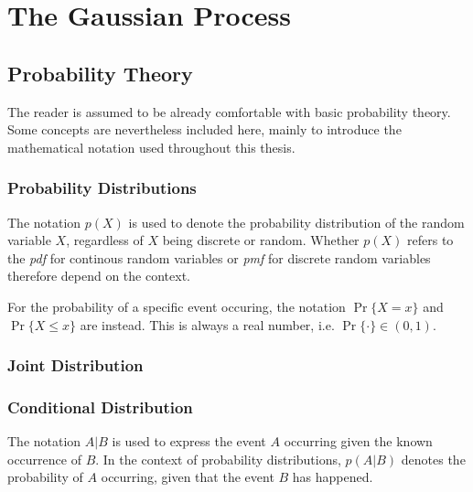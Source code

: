 \chapter{The Gaussian Process}\label{chap:theory}

\section{Probability Theory}
The reader is assumed to be already comfortable with basic probability theory. Some concepts are nevertheless included here, mainly to introduce the mathematical notation used throughout this thesis. 

\subsection{Probability Distributions}
The notation $p(X)$ is used to denote the probability distribution of the random variable $X$, regardless of $X$ being discrete or random. Whether $p(X)$ refers to the \textit{\acrfull{pdf}} for continous random variables or \textit{\acrfull{pmf}} for discrete random variables therefore depend on the context. 

For the probability of a specific event occuring, the notation $\Pr\{X=x\}$ and $\Pr\{X \leq x\}$ are instead. This is always a real number, i.e. $\Pr\{\cdot\} \in (0, 1)$. 

\subsection{Joint Distribution}

\subsection{Conditional Distribution}
The notation $A | B$ is used to express the event $A$ occurring given the known occurrence of $B$. In the context of probability distributions, $p(A | B)$ denotes the probability of $A$ occurring, given that the event $B$ has happened.

